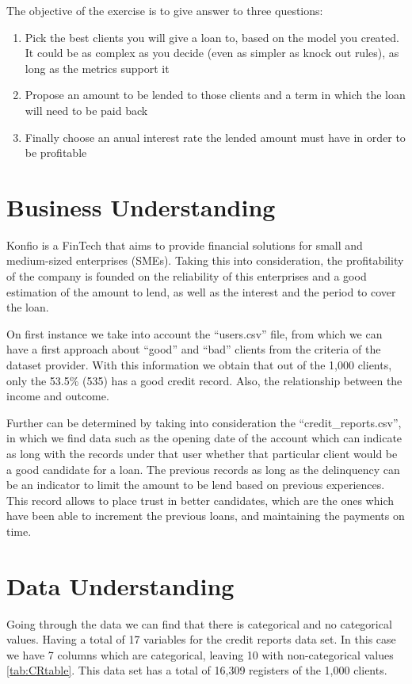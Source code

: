 \documentclass[a4paper,12pt]{article}
\begin{document}
The objective of the exercise is to give answer to three questions:
\begin{enumerate}
    \item Pick the best clients you will give a loan to, based on the model you created. It could be as complex as you decide (even as simpler as knock out rules), as long as the metrics support it
    \item Propose an amount to be lended to those clients and a term in which the loan will need to be paid back
    \item Finally choose an anual interest rate the lended amount must have in order to be profitable
\end{enumerate}\newpage   

\section{Business Understanding}
Konfio is a FinTech that aims to provide financial solutions for small and medium-sized enterprises (SMEs). Taking this into consideration, the profitability of the company is founded on the reliability of this enterprises and a good estimation of the amount to lend, as well as the interest and the period to cover the loan.

On first instance we take into account the ``users.csv'' file, from which we can have a first approach about ``good'' and ``bad'' clients from the criteria of the dataset provider. With this information we obtain that out of the 1,000 clients, only the  53.5\% (535) has a good credit record. Also, the relationship between the income and outcome.

Further can be determined by taking into consideration the ``credit\_reports.csv'', in which we find  data such as the opening date of the account which can indicate as long with the records under that user whether that particular client would be a good candidate for a loan. The previous records as long as the delinquency can be an indicator to limit the amount to be lend based on previous experiences. This record allows to place trust in better candidates, which are the ones which have been able to increment the previous loans, and maintaining the payments on time.\newpage

\section{Data Understanding} 
Going through the data we can find that there is categorical and no categorical values. Having a total of 17 variables for the credit reports data set. In this case we have 7 columns which are categorical, leaving 10 with non-categorical values \ref{tab:CRtable}. This data set has a total of 16,309 registers of the 1,000 clients.
\end{document}
